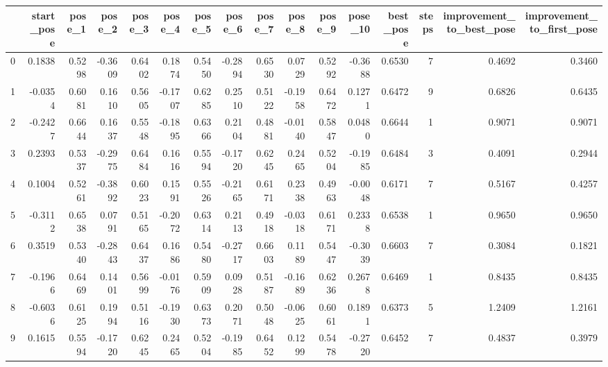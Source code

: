 \begin{tabular}{lrrrrrrrrrrrrrrr}
\toprule
{} &  start\_pose &  pose\_1 &  pose\_2 &  pose\_3 &  pose\_4 &  pose\_5 &  pose\_6 &  pose\_7 &  pose\_8 &  pose\_9 &  pose\_10 &  best\_pose &  steps &  improvement\_to\_best\_pose &  improvement\_to\_first\_pose \\
\midrule
0   &      0.1838 &  0.5298 & -0.3609 &  0.6402 &  0.1874 &  0.5450 & -0.2894 &  0.6530 &  0.0729 &  0.5292 &  -0.3688 &     0.6530 &      7 &                    0.4692 &                     0.3460 \\
1   &     -0.0354 &  0.6081 &  0.1610 &  0.5605 & -0.1707 &  0.6285 &  0.2510 &  0.5122 & -0.1958 &  0.6472 &   0.1271 &     0.6472 &      9 &                    0.6826 &                     0.6435 \\
2   &     -0.2427 &  0.6644 &  0.1637 &  0.5548 & -0.1895 &  0.6366 &  0.2104 &  0.4881 & -0.0140 &  0.5847 &   0.0480 &     0.6644 &      1 &                    0.9071 &                     0.9071 \\
3   &      0.2393 &  0.5337 & -0.2975 &  0.6484 &  0.1616 &  0.5594 & -0.1720 &  0.6245 &  0.2465 &  0.5204 &  -0.1985 &     0.6484 &      3 &                    0.4091 &                     0.2944 \\
4   &      0.1004 &  0.5261 & -0.3892 &  0.6023 &  0.1591 &  0.5526 & -0.2165 &  0.6171 &  0.2338 &  0.4963 &  -0.0048 &     0.6171 &      7 &                    0.5167 &                     0.4257 \\
5   &     -0.3112 &  0.6538 &  0.0791 &  0.5165 & -0.2072 &  0.6314 &  0.2113 &  0.4918 & -0.0318 &  0.6171 &   0.2338 &     0.6538 &      1 &                    0.9650 &                     0.9650 \\
6   &      0.3519 &  0.5340 & -0.2843 &  0.6437 &  0.1686 &  0.5480 & -0.2717 &  0.6603 &  0.1189 &  0.5447 &  -0.3039 &     0.6603 &      7 &                    0.3084 &                     0.1821 \\
7   &     -0.1966 &  0.6469 &  0.1401 &  0.5699 & -0.0176 &  0.5909 &  0.0928 &  0.5187 & -0.1689 &  0.6236 &   0.2678 &     0.6469 &      1 &                    0.8435 &                     0.8435 \\
8   &     -0.6036 &  0.6125 &  0.1994 &  0.5116 & -0.1930 &  0.6373 &  0.2071 &  0.5048 & -0.0625 &  0.6061 &   0.1891 &     0.6373 &      5 &                    1.2409 &                     1.2161 \\
9   &      0.1615 &  0.5594 & -0.1720 &  0.6245 &  0.2465 &  0.5204 & -0.1985 &  0.6452 &  0.1299 &  0.5478 &  -0.2720 &     0.6452 &      7 &                    0.4837 &                     0.3979 \\

\end{tabular}

